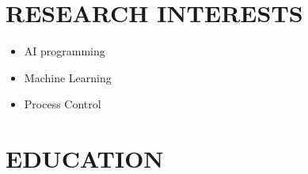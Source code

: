 \documentclass[10pt,a4paper,sans]{moderncv} %
\begin{document}
	
	\makecvtitle
	
	\section{RESEARCH INTERESTS}
	\begin{itemize}
		 
		   \begin{itemize}
		    \item AI programming
		     \item Machine Learning
		     
		   \end{itemize}
		
		
		
		      \begin{itemize}
		       \item Process Control
		       
		      \end{itemize}
		     
	\end{itemize}
	
	\vspace{-0.9em}
	
	\section{EDUCATION}
	
\end{document}
